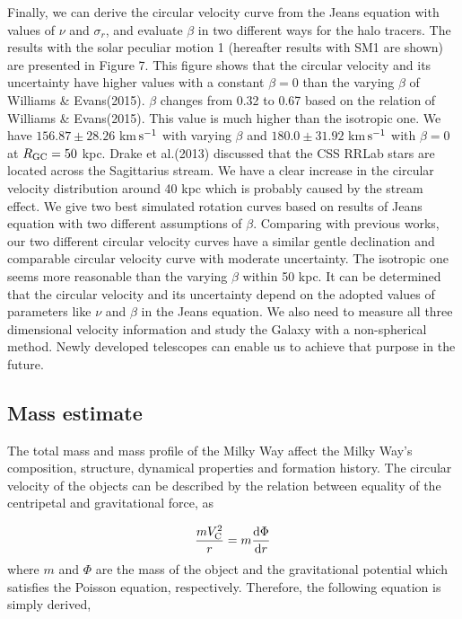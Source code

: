 \documentclass[12pt,preprint]{aastex}
\begin{document}
Finally, we can derive the circular velocity curve from the Jeans equation with values of $\nu$ and $\sigma_r$, and evaluate $\beta$ in two different ways for the halo tracers. The results with the solar peculiar motion 1 (hereafter results with SM1 are shown) are presented in Figure 7. This figure shows that the circular velocity and its uncertainty have higher values with a constant $\beta = 0$ than the varying $\beta$ of Williams \& Evans(2015).
$\beta$ changes from 0.32 to 0.67 based on the relation of Williams \& Evans(2015). This value is much higher than the isotropic one. We have $156.87\pm28.26$ km$\,\rm s^{-1}$ with varying $\beta$ and $180.0\pm31.92$ km$\,\rm s^{-1}$ with $\beta = 0$ at $R_{\rm GC} = 50$ kpc. Drake et al.(2013) discussed that the CSS RRLab stars are located across the Sagittarius stream. We have a clear increase in the circular velocity distribution around 40 kpc which is probably caused by the stream effect. We give two best simulated rotation curves based on results of Jeans equation with two different assumptions of $\beta$. Comparing with previous works, our two different circular velocity curves have a similar gentle declination and comparable circular velocity curve with moderate uncertainty. The isotropic one seems more reasonable than the varying $\beta$ within 50 kpc. It can be determined that the circular velocity and its uncertainty depend on the adopted values of parameters like $\nu$ and $\beta$ in the Jeans equation. We also need to measure all three dimensional velocity information and study the Galaxy with a non-spherical method. Newly developed telescopes can enable us to achieve that purpose in the future.

\subsection{Mass estimate}

The total mass and mass profile of the Milky Way affect the Milky Way's composition, structure, dynamical
properties and formation history. The circular velocity of the objects can be described by the relation between equality of the centripetal and gravitational force, as

\begin{equation}
\frac{m V^2_{\rm C}}{r} = m\frac{{\rm d}\Phi}{{\rm d}r}
\end{equation}
where $m$ and $\Phi$ are the mass of the object and the gravitational potential which satisfies the Poisson equation, respectively. Therefore, the following equation is simply derived,
\end{document}
